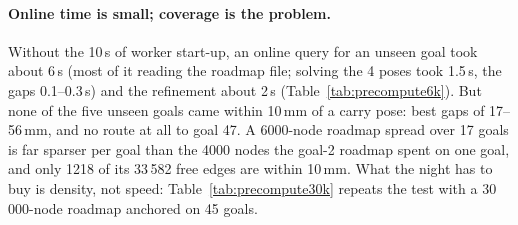 \begin{table}[h]
\centering
\footnotesize
\setlength{\tabcolsep}{3pt}
\caption{A night roadmap of 6000 nodes anchored on 17 other goals of B18 and the three
carry poses, then five online queries for unseen goals (8 workers). Worker start-up is
listed apart: a planner that runs for a whole session pays it once.}
\label{tab:precompute6k}

\end{table}

\paragraph{Online time is small; coverage is the problem.} Without the 10\,s of
worker start-up, an online query for an unseen goal took about 6\,s (most of it
reading the roadmap file; solving the 4 poses took 1.5\,s, the gaps 0.1--0.3\,s)
and the refinement about 2\,s (Table~\ref{tab:precompute6k}). But none of the five
unseen goals came within 10\,mm of a carry pose: best gaps of 17--56\,mm, and no
route at all to goal 47. A 6000-node roadmap spread over 17 goals is far sparser per
goal than the 4000 nodes the goal-2 roadmap spent on one goal, and only 1218 of its
33\,582 free edges are within 10\,mm. What the night has to buy is density, not
speed: Table~\ref{tab:precompute30k} repeats the test with a 30\,000-node roadmap
anchored on 45 goals.

\begin{table}[h]
\centering
\footnotesize
\setlength{\tabcolsep}{3pt}
\caption{The same test with a night roadmap of 30\,000 nodes anchored on the 45 other
goals of B18.}
\label{tab:precompute30k}
\end{table}

